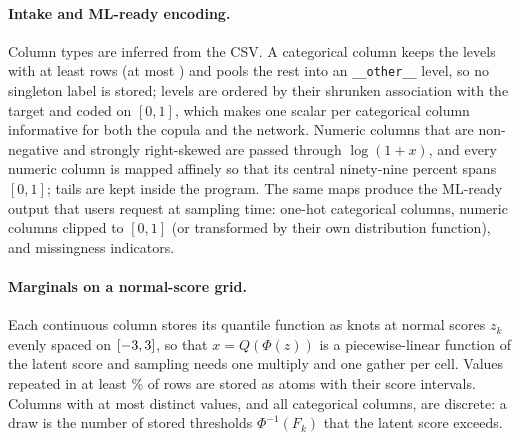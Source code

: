 \paragraph{Intake and ML-ready encoding.}
Column types are inferred from the CSV. A categorical column keeps the levels with at least
\CfgMinLevel{} rows (at most \CfgMaxLevels{}) and pools the rest into an \texttt{\_\_other\_\_} level,
so no singleton label is stored; levels are ordered by their shrunken association with the target
and coded on $[0,1]$, which makes one scalar per categorical column informative for both the copula
and the network. Numeric columns that are non-negative and strongly right-skewed are passed through
$\log(1+x)$, and every numeric column is mapped affinely so that its central ninety-nine percent
spans $[0,1]$; tails are kept inside the program. The same maps produce the ML-ready output that
users request at sampling time: one-hot categorical columns, numeric columns clipped to $[0,1]$ (or
transformed by their own distribution function), and missingness indicators.

\paragraph{Marginals on a normal-score grid.}
Each continuous column stores its quantile function as knots at normal scores $z_k$ evenly spaced
on $[-3,3]$, so that $x=Q(\Phi(z))$ is a piecewise-linear function of the latent
score and sampling needs one multiply and one gather per cell. Values repeated in at least
\CfgAtomShare\% of rows are stored as atoms with their score intervals. Columns with at most
\CfgMaxDiscrete{} distinct values, and all categorical columns, are discrete: a draw is the number of
stored thresholds $\Phi^{-1}(F_k)$ that the latent score exceeds.

